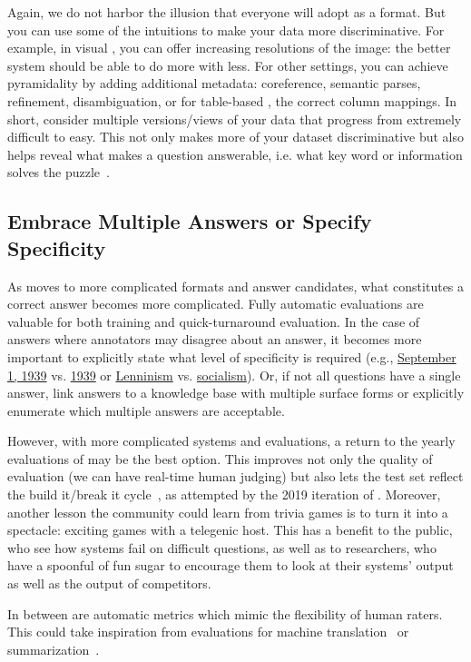 Again, we do not harbor the illusion that everyone will adopt \qb{} as a format.
But you can use some of the intuitions to make your data more discriminative.
For example, in visual , you can offer increasing resolutions of the image: the better system should be able to do more with less.
For other settings, you can achieve pyramidality by adding additional metadata: coreference, semantic parses, refinement, disambiguation, or for table-based , the correct column mappings.
In short, consider multiple versions/views of your data that progress from extremely difficult to easy.
This not only makes more of your dataset discriminative but also helps reveal what makes a question answerable, i.e. what key word or information solves the puzzle~\cite[Chapter 10]{klagge-10}.

\subsection{Embrace Multiple Answers or Specify Specificity}

As \qa{} moves to more complicated formats and answer candidates, what constitutes a correct answer becomes more complicated.
Fully automatic evaluations are valuable for both training and quick-turnaround evaluation.
In the case of answers where annotators may disagree about an answer, it becomes more important to explicitly state what level of specificity is required (e.g., \underline{September 1, 1939} vs. \underline{1939} or \underline{Lenninism} vs. \underline{socialism}).
Or, if not all questions have a single answer, link answers to a knowledge base with multiple surface forms or explicitly enumerate which multiple answers are acceptable.

However, with more complicated systems and evaluations, a return to the yearly evaluations of  may be the best option.
This improves not only the quality of evaluation (we can have real-time human judging) but also lets the test set reflect the build it/break it cycle~\cite{ruef-16}, as attempted by the 2019 iteration of .
Moreover, another lesson the  community could learn from trivia games is to turn it into a spectacle: exciting games with a telegenic host.
This has a benefit to the public, who see how  systems fail on difficult questions, as well as to  researchers, who have a spoonful of fun sugar to encourage them to look at their systems' output as well as the output of competitors.

In between are automatic metrics which mimic the flexibility of human raters.
This could take inspiration from evaluations for machine translation~\cite{papineni-02,specia-10} or summarization~\cite{lin-04}.

